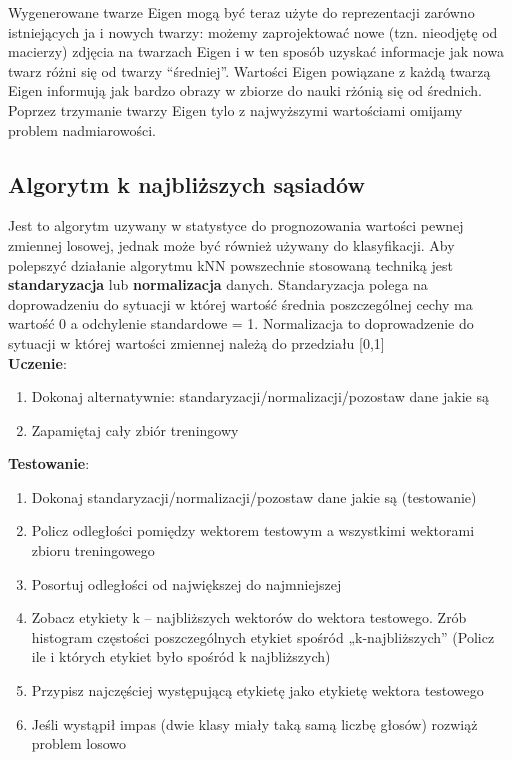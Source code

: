 \noindent Wygenerowane twarze Eigen mogą być teraz użyte do reprezentacji zarówno istniejących ja i nowych twarzy: możemy zaprojektować nowe (tzn. nieodjętę od macierzy) zdjęcia na twarzach Eigen i w ten sposób uzyskać informacje jak nowa twarz różni się od twarzy “średniej”. Wartości Eigen powiązane z każdą twarzą Eigen informują jak bardzo obrazy w zbiorze do nauki rżónią się od średnich. Poprzez trzymanie twarzy Eigen tylo z najwyższymi wartościami omijamy problem nadmiarowości.
\newpage
\subsection{Algorytm k najbliższych sąsiadów}
Jest to algorytm uzywany w statystyce do prognozowania wartości pewnej zmiennej losowej, jednak może być również używany do klasyfikacji. Aby polepszyć działanie algorytmu kNN powszechnie stosowaną techniką jest \textbf{standaryzacja} lub \textbf{normalizacja} danych. Standaryzacja polega na doprowadzeniu do sytuacji w której wartość średnia poszczególnej cechy ma wartość 0 a odchylenie standardowe = 1. Normalizacja to  doprowadzenie do sytuacji w której wartości zmiennej należą do przedziału [0,1]
\newline \\
\textbf{Uczenie}:
\begin{enumerate}
  \item Dokonaj alternatywnie: standaryzacji/normalizacji/pozostaw dane jakie są
  \item Zapamiętaj cały zbiór treningowy
\end{enumerate}
\textbf{Testowanie}:
\begin{enumerate}
  \item Dokonaj standaryzacji/normalizacji/pozostaw dane jakie są (testowanie)
  \item Policz odległości pomiędzy wektorem testowym a wszystkimi wektorami zbioru treningowego
  \item Posortuj odległości od największej do najmniejszej
  \item Zobacz etykiety  k – najbliższych wektorów do wektora testowego.  Zrób histogram częstości poszczególnych etykiet spośród „k-najbliższych” (Policz ile i których etykiet było spośród k najbliższych)
  \item Przypisz najczęściej występującą etykietę jako etykietę wektora testowego 
  \item Jeśli wystąpił impas (dwie klasy miały taką samą liczbę głosów) rozwiąż problem losowo
\end{enumerate}
\pagebreak[4]
